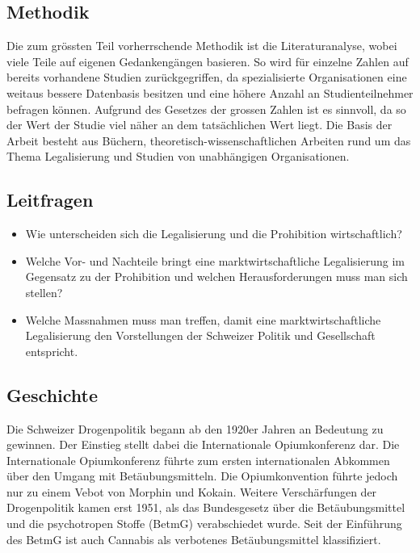 \documentclass[../main.tex]{subfiles}
\begin{document}
	 
	 \subsection{Methodik}
	 Die zum grössten Teil vorherrschende Methodik ist die Literaturanalyse, wobei viele Teile auf eigenen Gedankengängen basieren. 
	 So wird für einzelne Zahlen auf bereits vorhandene Studien zurückgegriffen, da spezialisierte Organisationen eine weitaus bessere Datenbasis besitzen und eine höhere Anzahl an Studienteilnehmer befragen können. 
	 Aufgrund des Gesetzes der grossen Zahlen ist es sinnvoll, da so der Wert der Studie viel näher an dem tatsächlichen Wert liegt.
	 Die Basis der Arbeit besteht aus Büchern, theoretisch-wissenschaftlichen Arbeiten rund um das Thema Legalisierung und Studien von unabhängigen Organisationen.
	 
	 \subsection{Leitfragen}
	 
	 \begin{itemize}
	 	\item Wie unterscheiden sich die Legalisierung und die Prohibition wirtschaftlich?
	 	\item Welche Vor- und Nachteile bringt eine marktwirtschaftliche Legalisierung im Gegensatz zu der Prohibition und welchen Herausforderungen muss man sich stellen?
	 	\item Welche Massnahmen muss man treffen, damit eine marktwirtschaftliche Legalisierung den Vorstellungen der Schweizer Politik und Gesellschaft entspricht.
	 \end{itemize}
	
	 
	 \subsection{Geschichte}
	 Die Schweizer Drogenpolitik begann ab den 1920er Jahren an Bedeutung zu gewinnen. 
	 Der Einstieg stellt dabei die Internationale Opiumkonferenz dar. 
	 Die Internationale Opiumkonferenz führte zum ersten internationalen Abkommen über den Umgang mit Betäubungsmitteln. 
	 Die Opiumkonvention führte jedoch nur zu einem Vebot von Morphin und Kokain. 
	 Weitere Verschärfungen der Drogenpolitik kamen erst 1951, als das Bundesgesetz über die Betäubungsmittel und die psychotropen Stoffe (BetmG) verabschiedet wurde.
	 Seit der Einführung des BetmG ist auch Cannabis als verbotenes Betäubungsmittel klassifiziert.\\	 
	 
\end{document}
